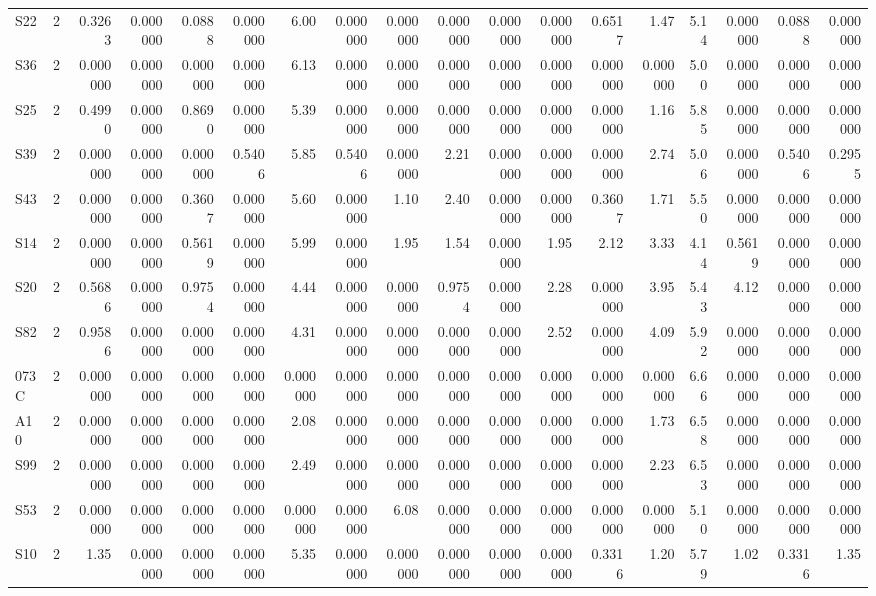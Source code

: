 {\begin{longtable}{lrrrrrrrrrrrrrrrrr}
  S22 & 2 & 0.3263 & 0.000000 & 0.0888 & 0.000000 & 6.00 & 0.000000 & 0.000000 & 0.000000 & 0.000000 & 0.000000 & 0.6517 & 1.47 & 5.14 & 0.000000 & 0.0888 & 0.000000 \\
  S36 & 2 & 0.000000 & 0.000000 & 0.000000 & 0.000000 & 6.13 & 0.000000 & 0.000000 & 0.000000 & 0.000000 & 0.000000 & 0.000000 & 0.000000 & 5.00 & 0.000000 & 0.000000 & 0.000000 \\
  S25 & 2 & 0.4990 & 0.000000 & 0.8690 & 0.000000 & 5.39 & 0.000000 & 0.000000 & 0.000000 & 0.000000 & 0.000000 & 0.000000 & 1.16 & 5.85 & 0.000000 & 0.000000 & 0.000000 \\
  S39 & 2 & 0.000000 & 0.000000 & 0.000000 & 0.5406 & 5.85 & 0.5406 & 0.000000 & 2.21 & 0.000000 & 0.000000 & 0.000000 & 2.74 & 5.06 & 0.000000 & 0.5406 & 0.2955 \\
  S43 & 2 & 0.000000 & 0.000000 & 0.3607 & 0.000000 & 5.60 & 0.000000 & 1.10 & 2.40 & 0.000000 & 0.000000 & 0.3607 & 1.71 & 5.50 & 0.000000 & 0.000000 & 0.000000 \\
  S14 & 2 & 0.000000 & 0.000000 & 0.5619 & 0.000000 & 5.99 & 0.000000 & 1.95 & 1.54 & 0.000000 & 1.95 & 2.12 & 3.33 & 4.14 & 0.5619 & 0.000000 & 0.000000 \\
  S20 & 2 & 0.5686 & 0.000000 & 0.9754 & 0.000000 & 4.44 & 0.000000 & 0.000000 & 0.9754 & 0.000000 & 2.28 & 0.000000 & 3.95 & 5.43 & 4.12 & 0.000000 & 0.000000 \\
  S82 & 2 & 0.9586 & 0.000000 & 0.000000 & 0.000000 & 4.31 & 0.000000 & 0.000000 & 0.000000 & 0.000000 & 2.52 & 0.000000 & 4.09 & 5.92 & 0.000000 & 0.000000 & 0.000000 \\
  073C & 2 & 0.000000 & 0.000000 & 0.000000 & 0.000000 & 0.000000 & 0.000000 & 0.000000 & 0.000000 & 0.000000 & 0.000000 & 0.000000 & 0.000000 & 6.66 & 0.000000 & 0.000000 & 0.000000 \\
  A10 & 2 & 0.000000 & 0.000000 & 0.000000 & 0.000000 & 2.08 & 0.000000 & 0.000000 & 0.000000 & 0.000000 & 0.000000 & 0.000000 & 1.73 & 6.58 & 0.000000 & 0.000000 & 0.000000 \\
  S99 & 2 & 0.000000 & 0.000000 & 0.000000 & 0.000000 & 2.49 & 0.000000 & 0.000000 & 0.000000 & 0.000000 & 0.000000 & 0.000000 & 2.23 & 6.53 & 0.000000 & 0.000000 & 0.000000 \\
  S53 & 2 & 0.000000 & 0.000000 & 0.000000 & 0.000000 & 0.000000 & 0.000000 & 6.08 & 0.000000 & 0.000000 & 0.000000 & 0.000000 & 0.000000 & 5.10 & 0.000000 & 0.000000 & 0.000000 \\
  S10 & 2 & 1.35 & 0.000000 & 0.000000 & 0.000000 & 5.35 & 0.000000 & 0.000000 & 0.000000 & 0.000000 & 0.000000 & 0.3316 & 1.20 & 5.79 & 1.02 & 0.3316 & 1.35 \\

\end{longtable}}
